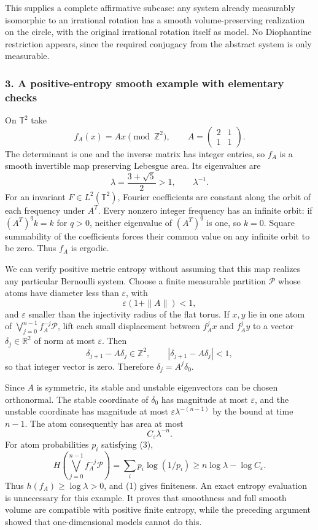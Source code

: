 \documentclass[11pt]{article}
\begin{document}
This supplies a complete affirmative subcase: any system already measurably isomorphic to an irrational rotation has a smooth volume-preserving realization on the circle, with the original irrational rotation itself as model. No Diophantine restriction appears, since the required conjugacy from the abstract system is only measurable.

\subsubsection{3. A positive-entropy smooth example with elementary checks}
On $\mathbb T^2$ take
\[
 f_A(x)=Ax\pmod{\mathbb Z^2},\qquad
 A=\begin{pmatrix}2&1\\1&1\end{pmatrix}.
\]
The determinant is one and the inverse matrix has integer entries, so $f_A$ is a smooth invertible map preserving Lebesgue area. Its eigenvalues are
\[
 \lambda=\frac{3+\sqrt5}{2}>1,\qquad\lambda^{-1}.
\]
For an invariant $F\in L^2(\mathbb T^2)$, Fourier coefficients are constant along the orbit of each frequency under $A^T$. Every nonzero integer frequency has an infinite orbit: if $(A^T)^qk=k$ for $q>0$, neither eigenvalue of $(A^T)^q$ is one, so $k=0$. Square summability of the coefficients forces their common value on any infinite orbit to be zero. Thus $f_A$ is ergodic.

We can verify positive metric entropy without assuming that this map realizes any particular Bernoulli system. Choose a finite measurable partition $\mathcal P$ whose atoms have diameter less than $\varepsilon$, with
\[
 \varepsilon(1+\|A\|)<1,
\]
and $\varepsilon$ smaller than the injectivity radius of the flat torus. If $x,y$ lie in one atom of $\bigvee_{j=0}^{n-1}f_A^{-j}\mathcal P$, lift each small displacement between $f_A^jx$ and $f_A^jy$ to a vector $\delta_j\in\mathbb R^2$ of norm at most $\varepsilon$. Then
\[
 \delta_{j+1}-A\delta_j\in\mathbb Z^2,
 \qquad |\delta_{j+1}-A\delta_j|<1,
\]
so that integer vector is zero. Therefore $\delta_j=A^j\delta_0$.

Since $A$ is symmetric, its stable and unstable eigenvectors can be chosen orthonormal. The stable coordinate of $\delta_0$ has magnitude at most $\varepsilon$, and the unstable coordinate has magnitude at most $\varepsilon\lambda^{-(n-1)}$ by the bound at time $n-1$. The atom consequently has area at most
\[
 C_\varepsilon\lambda^{-n}.                             \tag{3}
\]
For atom probabilities $p_i$ satisfying (3),
\[
 H\!\left(\bigvee_{j=0}^{n-1}f_A^{-j}\mathcal P\right)
 =\sum_i p_i\log(1/p_i)
 \geq n\log\lambda-\log C_\varepsilon.
\]
Thus $h(f_A)\geq\log\lambda>0$, and (1) gives finiteness. An exact entropy evaluation is unnecessary for this example. It proves that smoothness and full smooth volume are compatible with positive finite entropy, while the preceding argument showed that one-dimensional models cannot do this.
\end{document}
